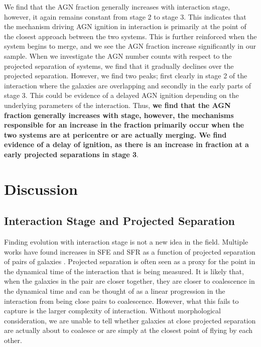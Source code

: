 We find that the AGN fraction generally increases with interaction stage, however, it again remains constant from stage 2 to stage 3. This indicates that the mechanism driving AGN ignition in interaction is primarily at the point of the closest approach between the two systems. This is further reinforced when the system begins to merge, and we see the AGN fraction increase significantly in our sample. When we investigate the AGN number counts with respect to the projected separation of systems, we find that it gradually declines over the projected separation. However, we find two peaks; first clearly in stage 2 of the interaction where the galaxies are overlapping and secondly in the early parts of stage 3. This could be evidence of a delayed AGN ignition depending on the underlying parameters of the interaction. Thus, \textbf{we find that the AGN fraction generally increases with stage, however, the mechanisms responsible for an increase in the fraction primarily occur when the two systems are at pericentre or are actually merging. We find evidence of a delay of ignition, as there is an increase in fraction at a early projected separations in stage 3}.

\section{Discussion}\label{discussion}
\subsection{Interaction Stage and Projected Separation}
\noindent Finding evolution with interaction stage is not a new idea in the field. Multiple works have found increases in SFE and SFR as a function of projected separation of pairs of galaxies \citep{2000ApJ...530..660B, 2008AJ....135.1877E, 2013MNRAS.433L..59P}. Projected separation is often seen as a proxy for the point in the dynamical time of the interaction that is being measured. It is likely that, when the galaxies in the pair are closer together, they are closer to coalescence in the dynamical time and can be thought of as a linear progression in the interaction from being close pairs to coalescence. However, what this fails to capture is the larger complexity of interaction. Without morphological consideration, we are unable to tell whether galaxies at close projected separation are actually about to coalesce or are simply at the closest point of flying by each other.


